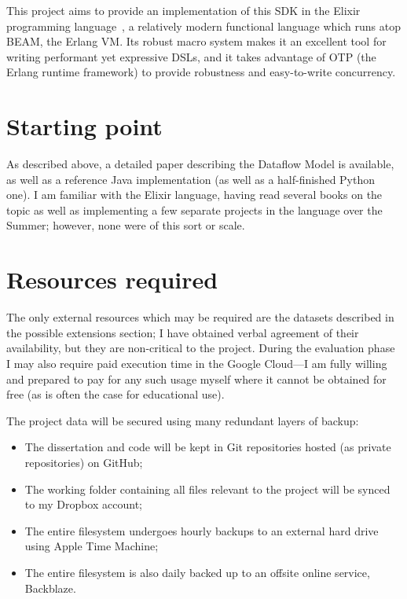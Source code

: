 This project aims to provide an implementation of this SDK in the Elixir programming language~\cite{Elixir}, a relatively modern functional language which runs atop BEAM, the Erlang VM. Its robust macro system makes it an excellent tool for writing performant yet expressive DSLs, and it takes advantage of OTP (the Erlang runtime framework) to provide robustness and easy-to-write concurrency.

\section*{Starting point}

As described above, a detailed paper describing the Dataflow Model is available, as well as a reference Java implementation (as well as a half-finished Python one). I am familiar with the Elixir language, having read several books on the topic as well as implementing a few separate projects in the language over the Summer; however, none were of this sort or scale.

\section*{Resources required}

The only external resources which may be required are the datasets described in the possible extensions section; I have obtained verbal agreement of their availability, but they are non-critical to the project. During the evaluation phase I may also require paid execution time in the Google Cloud---I am fully willing and prepared to pay for any such usage myself where it cannot be obtained for free (as is often the case for educational use).

The project data will be secured using many redundant layers of backup:

\begin{itemize}
	\item The dissertation and code will be kept in Git repositories hosted (as private repositories) on GitHub;
	\item The working folder containing all files relevant to the project will be synced to my Dropbox account;
	\item The entire filesystem undergoes hourly backups to an external hard drive using Apple Time Machine;
	\item The entire filesystem is also daily backed up to an offsite online service, Backblaze.
\end{itemize}

